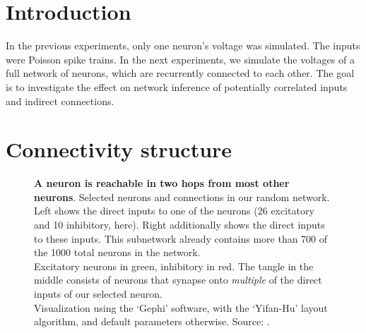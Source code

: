 
\section{Introduction}

In the previous experiments, only one neuron's voltage was simulated. The inputs were Poisson spike trains.
In the next experiments, we simulate the voltages of a full network of neurons, which are recurrently connected to each other.
The goal is to investigate the effect on network inference of potentially correlated inputs and indirect connections.



\section{Connectivity structure}

\begin{figure}
    \vspace*{2em}
    \caption
        {\textbf{A neuron is reachable in two hops from most other neurons}.    Selected neurons and connections in our random network. Left shows the direct inputs to one of the neurons (26 excitatory and 10 inhibitory, here). Right additionally shows the direct inputs to these inputs. This subnetwork already contains more than 700 of the 1000 total neurons in the network.\\
        Excitatory neurons in green, inhibitory in red. The tangle in the middle consists of neurons that synapse onto \emph{multiple} of the direct inputs of our selected neuron.\\
        Visualization using the `Gephi' software, with the `Yifan-Hu' layout algorithm, and default parameters otherwise.
        Source: .}
    \label{fig:gephi-network-viz}
\end{figure}

